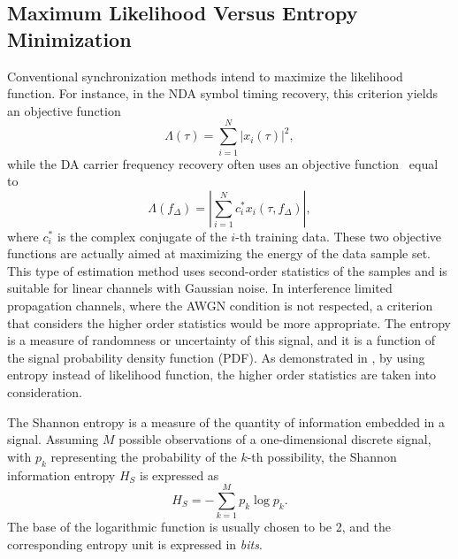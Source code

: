 \documentclass[journal,comsoc, onecolumn, 12pt,draftclsnofoot]{IEEEtran} %
\begin{document}
\subsection{Maximum Likelihood Versus Entropy Minimization}
Conventional synchronization methods intend to maximize the likelihood function.
For instance, in the NDA symbol timing recovery, this criterion yields an objective function~\cite{mengali1997synchronization}
\begin{equation}
\Lambda(\tau) =\sum\limits_{i = 1}^N {{{\left| {{x_i}( \tau )} \right|}^2}}, 
\end{equation}
while the DA carrier frequency recovery often uses an objective function~\cite{mengali1997synchronization} equal to
\begin{equation}
\Lambda ({f_\Delta })=\left| \sum\limits_{i = 1}^N {{{{c_i^*{x_i}(\tau ,{f_\Delta })}}}} \right|, 
\end{equation}
where \(c_i^*\) is the complex conjugate of the \(i\)-th training data.
These two objective functions are actually aimed at maximizing the energy of the data sample set.
This type of estimation method uses second-order statistics of the samples and is suitable for linear channels with Gaussian noise.
In interference limited propagation channels, where the AWGN condition is not respected, a criterion that considers the higher order statistics would be more appropriate.
The entropy is a measure of randomness or uncertainty of this signal, and it is a function of the signal probability density function (PDF).
As demonstrated in \cite{Santamaria2002}, by using entropy instead of likelihood function, the higher order statistics are taken into consideration.

The Shannon entropy is a measure of the quantity of information  embedded in a signal.
Assuming \(M\) possible observations of a one-dimensional discrete signal, with \(p_k\) representing the probability of the \(k\)-th possibility, the Shannon information entropy \(H_S\) is expressed as \cite{Shannon1948}
\begin{equation}
H_S =  - \sum\limits_{k = 1}^M {{p_k}\log {p_k}}.
\label{eq:entropy}
\end{equation}
The base of the logarithmic function is usually chosen to be 2, and the corresponding entropy unit is expressed in \textit{bits}.
\end{document}
